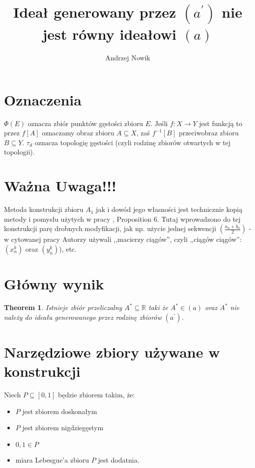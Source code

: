 \documentclass[12pt]{amsart}
\author{Andrzej Nowik}
\theoremstyle{plain}
\newtheorem{theorem}{Theorem}[section]
\theoremstyle{definition}
\theoremstyle{remark}
\newcommand{\real}{\mathbb{R}}
\newcommand{\aideal}{\mathit{(a)}}
\newcommand{\aidealprime}{\mathit{(a^\prime)}}
\begin{document}
\title{Ideał generowany przez $\aidealprime$ nie jest równy ideałowi $\aideal$}


\maketitle

\section{Oznaczenia}
$\Phi(E)$ oznacza zbiór punktów gęstości zbioru $E$.
Jeśli $f \colon X \to Y$ jest funkcją to przez
$f[A]$ oznaczamy obraz zbioru $A\subseteq X$, 
zaś $f^{-1}[B]$ przeciwobraz zbioru $B \subseteq Y$.
$\tau_d$ oznacza topologię gęstości (czyli rodzinę zbiorów otwartych w tej topologii).

\section{Ważna Uwaga!!!}
Metoda konstrukcji zbioru $A_1$ jak i dowód 
jego własności jest technicznie kopią metody i pomysłu
użytych w pracy \cite{FG}, Proposition 6.
Tutaj wprowadzono do tej konstrukcji parę
drobnych modyfikacji, jak np. użycie jednej
sekwencji $(\frac{a_n + b_n}{2})$ - w
cytowanej pracy Autorzy używali ,,macierzy ciągów'',
czyli ,,ciągów ciągów'': $(x_n^k)$ oraz $(y_n^k)$),
etc.

\section{Główny wynik}
\begin{theorem}
  Istnieje zbiór przeliczalny $A^* \subseteq \real$ taki że
$A^* \in \aideal$ oraz $A^*$ nie należy do ideału
generowanego przez rodzinę zbiorów $\aidealprime$.
\end{theorem}

\section{Narzędziowe zbiory używane w konstrukcji}

Niech $P \subseteq [0,1]$ będzie zbiorem takim, że:
\begin{itemize}
\item
  $P$ jest zbiorem doskonałym
\item
  $P$ jest zbiorem nigdziegęstym
\item
  $0, 1 \in P$
\item
  miara Lebesgue'a zbioru $P$ jest dodatnia.
\end{itemize}
\end{document}
